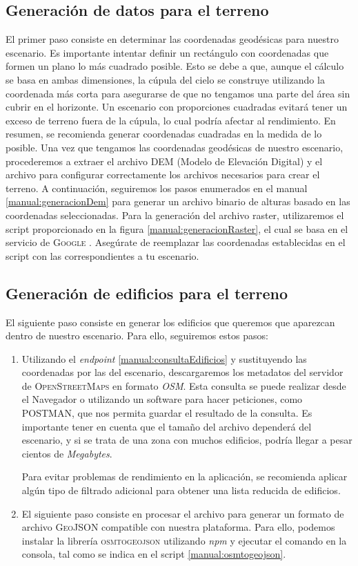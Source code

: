 \documentclass[a4paper, 11pt]{book}
\begin{document}
\subsection{Generación de datos para el terreno}
El primer paso consiste en determinar las coordenadas geodésicas para nuestro escenario. Es importante intentar definir un rectángulo con coordenadas que formen un plano lo más cuadrado posible. Esto se debe a que, aunque el cálculo se basa en ambas dimensiones, la cúpula del cielo se construye utilizando la coordenada más corta para asegurarse de que no tengamos una parte del área sin cubrir en el horizonte. 
Un escenario con proporciones cuadradas evitará tener un exceso de terreno fuera de la cúpula, lo cual podría afectar al rendimiento. En resumen, se recomienda generar coordenadas cuadradas en la medida de lo posible.
Una vez que tengamos las coordenadas geodésicas de nuestro escenario, procederemos a extraer el archivo \textsc{DEM} (Modelo de Elevación Digital) y el archivo  para configurar correctamente los archivos necesarios para crear el terreno. A continuación, seguiremos los pasos enumerados en el manual \ref{manual:generacionDem} para generar un archivo binario de alturas basado en las coordenadas seleccionadas. Para la generación del archivo raster, utilizaremos el script proporcionado en la figura \ref{manual:generacionRaster}, el cual se basa en el servicio de \textsc{Google} \cite{googleearthengine}. Asegúrate de reemplazar las coordenadas establecidas en el script con las correspondientes a tu escenario.

\subsection{Generación de edificios para el terreno}
El siguiente paso consiste en generar los edificios que queremos que aparezcan dentro de nuestro escenario. Para ello, seguiremos estos pasos:

\begin{enumerate}
	\item Utilizando el \emph{endpoint} \ref{manual:consultaEdificios} y sustituyendo las coordenadas por las del escenario, descargaremos los metadatos del servidor de \textsc{OpenStreetMaps} en formato \emph{OSM}. Esta consulta se puede realizar desde el Navegador o utilizando un software para hacer peticiones, como \textsc{POSTMAN}, que nos permita guardar el resultado de la consulta. Es importante tener en cuenta que el tamaño del archivo dependerá del escenario, y si se trata de una zona con muchos edificios, podría llegar a pesar cientos de \emph{Megabytes}. 
	
	Para evitar problemas de rendimiento en la aplicación, se recomienda aplicar algún tipo de filtrado adicional para obtener una lista reducida de edificios.
	\item El siguiente paso consiste en procesar el archivo para generar un formato de archivo \textsc{GeoJSON} compatible con nuestra plataforma. Para ello, podemos instalar la librería \textsc{osmtogeojson} utilizando \emph{\gls{npm}} y ejecutar el comando en la consola, tal como se indica en el script \ref{manual:osmtogeojson}.
\end{enumerate}
\end{document}
